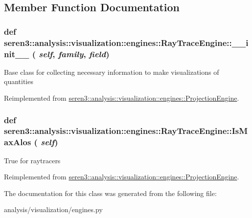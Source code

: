 \subsection{Member Function Documentation}
\hypertarget{classseren3_1_1analysis_1_1visualization_1_1engines_1_1RayTraceEngine_ab8058104b78f72e69896142942a4a964}{
\subsubsection[{\_\-\_\-init\_\-\_\-}]{\setlength{\rightskip}{0pt plus 5cm}def seren3::analysis::visualization::engines::RayTraceEngine::\_\-\_\-init\_\-\_\- ( {\em self}, \/   {\em family}, \/   {\em field})}}
\label{classseren3_1_1analysis_1_1visualization_1_1engines_1_1RayTraceEngine_ab8058104b78f72e69896142942a4a964}
\begin{DoxyVerb}
    Base class for collecting necessary information to make visualizations of quantities
\end{DoxyVerb}
 

Reimplemented from \hyperlink{classseren3_1_1analysis_1_1visualization_1_1engines_1_1ProjectionEngine_ab9066571de775d34e0a244225a4351fb}{seren3::analysis::visualization::engines::ProjectionEngine}.\hypertarget{classseren3_1_1analysis_1_1visualization_1_1engines_1_1RayTraceEngine_adaa78a86d554d76c6fd6063453b18d82}{
\subsubsection[{IsMaxAlos}]{\setlength{\rightskip}{0pt plus 5cm}def seren3::analysis::visualization::engines::RayTraceEngine::IsMaxAlos ( {\em self})}}
\label{classseren3_1_1analysis_1_1visualization_1_1engines_1_1RayTraceEngine_adaa78a86d554d76c6fd6063453b18d82}
\begin{DoxyVerb}
True for raytracers
\end{DoxyVerb}
 

Reimplemented from \hyperlink{classseren3_1_1analysis_1_1visualization_1_1engines_1_1ProjectionEngine}{seren3::analysis::visualization::engines::ProjectionEngine}.

The documentation for this class was generated from the following file:\begin{DoxyCompactItemize}
\item 
analysis/visualization/engines.py\end{DoxyCompactItemize}
